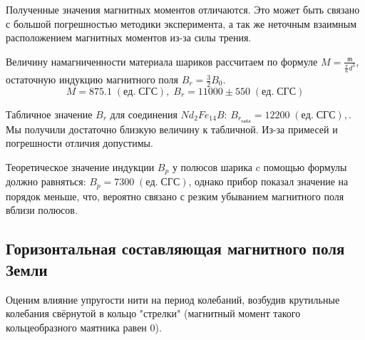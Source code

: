 Полученные значения магнитных моментов отличаются. Это может быть связано с большой погрешностью методики эксперимента, а так же неточным взаимным расположением магнитных моментов из-за силы трения. 

Величину намагниченности материала шариков рассчитаем по формуле $M = \frac{\mathfrak{m}}{\frac{\pi}{6} d^3}$, остаточную индукцию магнитного поля $B_r = \frac32B_0$. $$M = 875.1 \; (ед. \; СГС), \; B_r = 11000 \pm 550 \; (ед. \; СГС)$$

Табличное значение $B_r$ для соединения $Nd_2Fe_{14}B$:
$B_{r_{табл}} = 12200 \; (ед. \; СГС),$. Мы получили достаточно близкую величину к табличной. Из-за примесей и погрешности отличия допустимы. 

Теоретическое значение индукции $B_p$ у полюсов шарика c помощью формулы должно равняться:
$B_p = 7300 \; (ед. \; СГС)$, однако прибор показал значение на порядок меньше, что, вероятно связано с резким убыванием магнитного поля вблизи полюсов. 

\subsection{Горизонтальная составляющая магнитного поля Земли}

Оценим влияние упругости нити на период колебаний, возбудив крутильные колебания свёрнутой в кольцо "стрелки" (магнитный момент такого кольцеобразного маятника равен 0).

